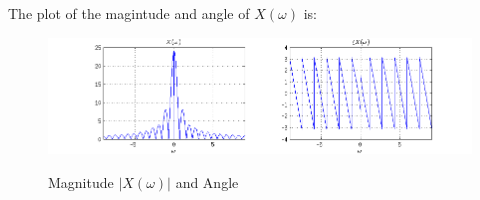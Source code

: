 The plot of the magintude and angle of $X(\omega)$ is:

\begin{figure}[H]
\caption{Magnitude $|X(\omega)|$ and Angle}
\centering
\includegraphics[width=1.0\textwidth]{figs/c2p3a.png}
\label{fig:c2p3a}
\end{figure} 


